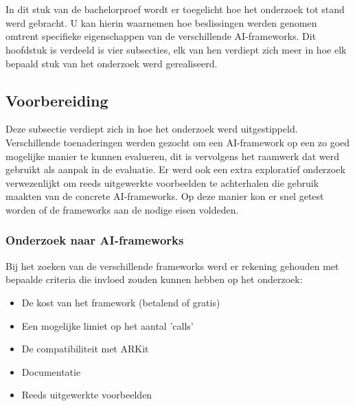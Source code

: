 
\chapter{}
\label{ch:methodologie}


In dit stuk van de bachelorproef wordt er toegelicht hoe het onderzoek tot stand werd gebracht. U kan hierin waarnemen hoe beslissingen werden genomen omtrent specifieke eigenschappen van de verschillende AI-frameworks. Dit hoofdstuk is verdeeld is vier subsecties, elk van hen verdiept zich meer in hoe elk bepaald stuk van het onderzoek werd gerealiseerd.

\section{Voorbereiding}
Deze subsectie verdiept zich in hoe het onderzoek werd uitgestippeld. Verschillende toenaderingen werden gezocht om een AI-framework op een zo goed mogelijke manier te kunnen evalueren, dit is vervolgens het raamwerk dat werd gebruikt als aanpak in de evaluatie. Er werd ook een extra exploratief onderzoek verwezenlijkt om reeds uitgewerkte voorbeelden te achterhalen die gebruik maakten van de concrete AI-frameworks. Op deze manier kon er snel getest worden of de frameworks aan de nodige eisen voldeden.
\newpage

\subsection{ Onderzoek naar AI-frameworks}
Bij het zoeken van de verschillende frameworks werd er rekening gehouden met bepaalde criteria die invloed zouden kunnen hebben op het onderzoek:
\begin{itemize}
	\item De kost van het framework (betalend of gratis)
	\item Een mogelijke limiet op het aantal 'calls'
	\item De compatibiliteit met ARKit
	\item Documentatie
	\item Reeds uitgewerkte voorbeelden
\end{itemize}

